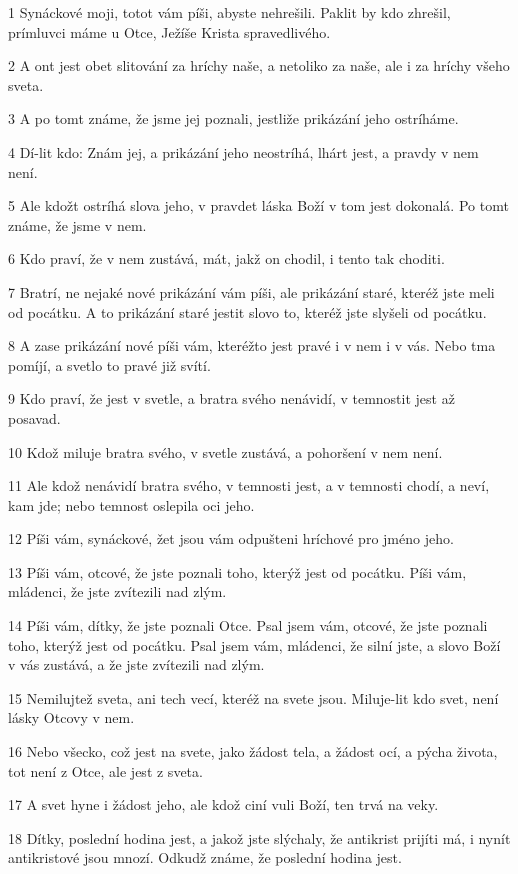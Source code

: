 \par 1 Synáckové moji, totot vám píši, abyste nehrešili. Paklit by kdo zhrešil, prímluvci máme u Otce, Ježíše Krista spravedlivého.
\par 2 A ont jest obet slitování za hríchy naše, a netoliko za naše, ale i za hríchy všeho sveta.
\par 3 A po tomt známe, že jsme jej poznali, jestliže prikázání jeho ostríháme.
\par 4 Dí-lit kdo: Znám jej, a prikázání jeho neostríhá, lhárt jest, a pravdy v nem není.
\par 5 Ale kdožt ostríhá slova jeho, v pravdet láska Boží v tom jest dokonalá. Po tomt známe, že jsme v nem.
\par 6 Kdo praví, že v nem zustává, mát, jakž on chodil, i tento tak choditi.
\par 7 Bratrí, ne nejaké nové prikázání vám píši, ale prikázání staré, kteréž jste meli od pocátku. A to prikázání staré jestit slovo to, kteréž jste slyšeli od pocátku.
\par 8 A zase prikázání nové píši vám, kteréžto jest pravé i v nem i v vás. Nebo tma pomíjí, a svetlo to pravé již svítí.
\par 9 Kdo praví, že jest v svetle, a bratra svého nenávidí, v temnostit jest až posavad.
\par 10 Kdož miluje bratra svého, v svetle zustává, a pohoršení v nem není.
\par 11 Ale kdož nenávidí bratra svého, v temnosti jest, a v temnosti chodí, a neví, kam jde; nebo temnost oslepila oci jeho.
\par 12 Píši vám, synáckové, žet jsou vám odpušteni hríchové pro jméno jeho.
\par 13 Píši vám, otcové, že jste poznali toho, kterýž jest od pocátku. Píši vám, mládenci, že jste zvítezili nad zlým.
\par 14 Píši vám, dítky, že jste poznali Otce. Psal jsem vám, otcové, že jste poznali toho, kterýž jest od pocátku. Psal jsem vám, mládenci, že silní jste, a slovo Boží v vás zustává, a že jste zvítezili nad zlým.
\par 15 Nemilujtež sveta, ani tech vecí, kteréž na svete jsou. Miluje-lit kdo svet, není lásky Otcovy v nem.
\par 16 Nebo všecko, což jest na svete, jako žádost tela, a žádost ocí, a pýcha života, tot není z Otce, ale jest z sveta.
\par 17 A svet hyne i žádost jeho, ale kdož ciní vuli Boží, ten trvá na veky.
\par 18 Dítky, poslední hodina jest, a jakož jste slýchaly, že antikrist prijíti má, i nynít antikristové jsou mnozí. Odkudž známe, že poslední hodina jest.
